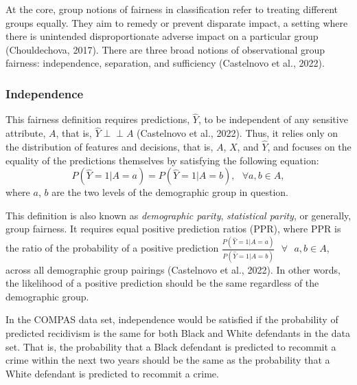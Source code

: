 \documentclass[12pt, twoside]{amherstthesis}
\begin{document}
At the core, group notions of fairness in classification refer to treating different groups equally. They aim to remedy or prevent disparate impact, a setting where there is unintended disproportionate adverse impact on a particular group (Chouldechova, 2017). There are three broad notions of observational group fairness: independence, separation, and sufficiency (Castelnovo et al., 2022).

\hypertarget{independence}{%
\subsubsection{Independence}\label{independence}}

\newcommand{\indep}{\perp \!\!\! \perp}

This fairness definition requires predictions, \(\hat{Y}\), to be independent of any sensitive attribute, \(A\), that is, \(\hat{Y} \perp \!\!\! \perp A\) (Castelnovo et al., 2022). Thus, it relies only on the distribution of features and decisions, that is, \(A\), \(X\), and \(\hat{Y}\), and focuses on the equality of the predictions themselves by satisfying the following equation:
\begin{equation}
\label{ch1eq3}
P (\hat{Y} = 1 | A = a) = P (\hat{Y} = 1 | A = b), \text{    } \forall a, b \in A,
\end{equation}
where \(a\), \(b\) are the two levels of the demographic group in question.

This definition is also known as \emph{demographic parity}, \emph{statistical parity}, or generally, group fairness. It requires equal positive prediction ratios (PPR), where PPR is the ratio of the probability of a positive prediction \(\frac{P(\hat{Y} = 1 | A = a)}{P(\hat{Y} = 1 | A = b)} \text{ } \forall \text{ } a, b \in A\), across all demographic group pairings (Castelnovo et al., 2022). In other words, the likelihood of a positive prediction should be the same regardless of the demographic group.

In the COMPAS data set, independence would be satisfied if the probability of predicted recidivism is the same for both Black and White defendants in the data set. That is, the probability that a Black defendant is predicted to recommit a crime within the next two years should be the same as the probability that a White defendant is predicted to recommit a crime.
\end{document}
